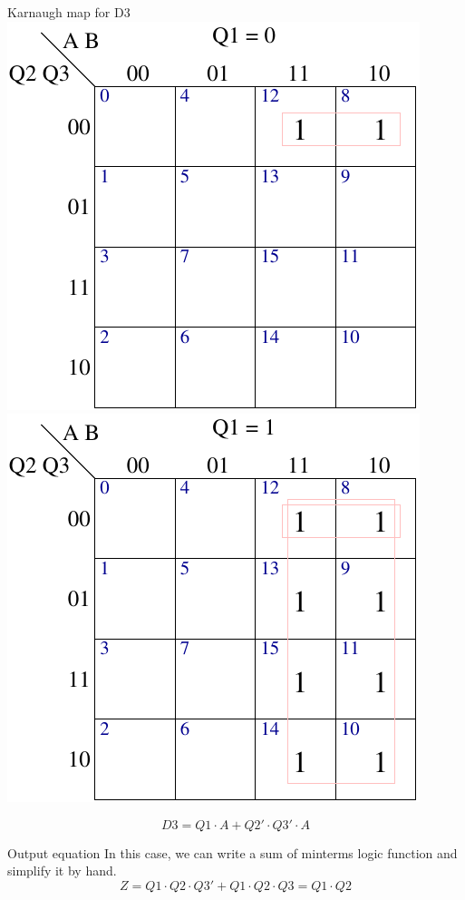 \begin{frame}{Karnaugh map for D3}
  \includegraphics[scale=0.7]{D3Q1is0KMap}
  \includegraphics[scale=0.7]{D3Q1is1KMap}
\end{frame}

$$D3 = Q1 \cdot A + Q2' \cdot Q3' \cdot A$$

\begin{frame}{Output equation}
  In this case, we can write a sum of minterms logic function and simplify it by hand.
  $$Z = Q1 \cdot Q2 \cdot Q3' + Q1 \cdot Q2 \cdot Q3 = Q1 \cdot Q2$$
\end{frame}


